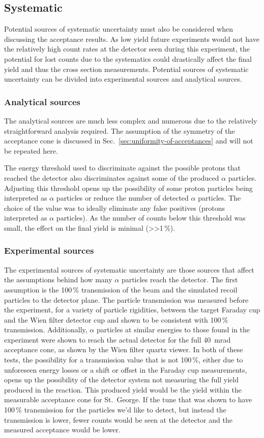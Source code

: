 \subsection{Systematic}

Potential sources of systematic uncertainty must also be considered when
discussing the acceptance results. As low yield future experiments would
not have the relatively high count rates at the detector seen during
this experiment, the potential for lost counts due to the systematics
could drastically affect the final yield and thus the cross section
measurements. Potential sources of systematic uncertainty can be divided
into experimental sources and analytical sources.

\subsubsection{Analytical sources}
The analytical sources are much less complex and numerous due to the
relatively straightforward analysis required. The assumption of the
symmetry of the acceptance cone is discussed in
Sec.~\ref{sec:uniformity-of-acceptances} and will not be repeated here.

The energy threshold used to discriminate against the possible protons
that reached the detector also discriminates against some of the
produced $\alpha$ particles. Adjusting this threshold opens up the
possibility of some proton particles being interpreted as $\alpha$
particles or reduce the number of detected $\alpha$ particles. The
choice of the value was to ideally eliminate any false positives
(protons interpreted as $\alpha$ particles). As the number of counts
below this threshold was small, the effect on the final yield is
minimal (>>1\,\%).

\subsubsection{Experimental sources}
The experimental sources of systematic uncertainty are those sources
that affect the assumptions behind how many $\alpha$ particles reach the
detector. The first assumption is the 100\,\% transmission of the beam
and the simulated recoil particles to the detector plane. The particle
transmission was measured before the experiment, for a variety of
particle rigidities, between the target Faraday cup and the Wien filter
detector cup and shown to be consistent with 100\,\% transmission.
Additionally, $\alpha$ particles at similar energies to those found in
the experiment were shown to reach the actual detector for the full
40~mrad acceptance cone, as shown by the Wien filter quartz viewer. In
both of these tests, the possibility for a transmission value that is
not 100\,\%, either due to unforeseen energy losses or a shift or offset
in the Faraday cup measurements, opens up the possibility of the
detector system not measuring the full yield produced in the reaction.
This produced yield would be the yield within the measurable acceptance
cone for St.\ George. If the tune that was shown to have 100\,\%
transmission for the particles we'd like to detect, but instead the
transmission is lower, fewer counts would be seen at the detector and
the measured acceptance would be lower.

